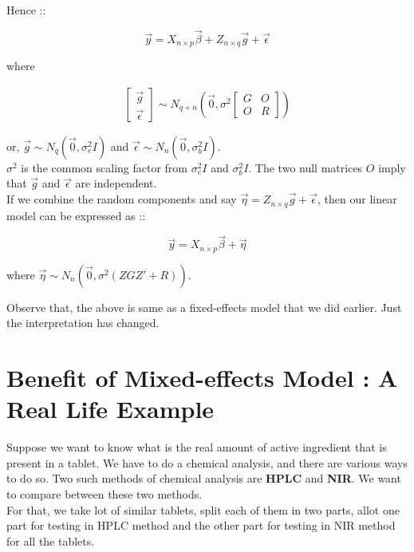 \documentclass[11pt, a4paper]{article}\usepackage[]{graphicx}\usepackage[]{xcolor}
\begin{document}
Hence ::

$$\vec{y} = X_{n \times p}\vec{\beta} + Z_{n \times q}\vec{g} + \vec{\epsilon}$$

where 

\begin{gather}
	\begin{bmatrix} \vec{g} \\	\vec{\epsilon} \end{bmatrix}
	\sim N_{q+n} \left( \vec{0}, \sigma^2 
	\begin{bmatrix}	G & O \\	O & R	\end{bmatrix} \right)
\end{gather}

or, $\vec{g} \sim N_q \left( \vec{0}, \sigma_e^2I \right)$ and $\vec{\epsilon} \sim N_n \left( \vec{0}, \sigma_b^2I \right)$. \\

$\sigma^2$ is the common scaling factor from $\sigma_e^2I$ and $\sigma_b^2I$. The two null matrices $O$ imply that $\vec{g}$ and $\vec{\epsilon}$ are independent. \\

If we combine the random components and say $\vec{\eta} = Z_{n \times q}\vec{g} + \vec{\epsilon}$, then our linear model can be expressed as ::

$$\vec{y} = X_{n \times p}\vec{\beta} + \vec{\eta}$$

where $\vec{\eta} \sim N_n(\vec{0}, \sigma^2(ZGZ' + R))$.

Observe that, the above is same as a fixed-effects model that we did earlier. Just the interpretation has changed.

\section*{Benefit of Mixed-effects Model : A Real Life Example}

Suppose we want to know what is the real amount of active ingredient that is present in a tablet. We have to do a chemical analysis, and there are various ways to do so. Two such methods of chemical analysis are \textbf{HPLC} and \textbf{NIR}. We want to compare between these two methods. \\

For that, we take lot of similar tablets, split each of them in two parts, allot one part for testing in HPLC method and the other part for testing in NIR method for all the tablets. \\
\end{document}
